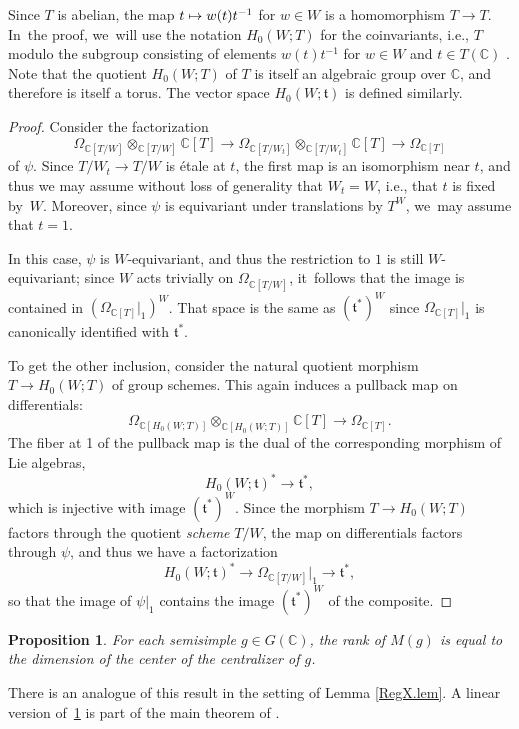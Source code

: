 \documentclass[JEP,XML,SOM,Unicode,NoFloatCountersInSection,published]{cedram}
\newcommand\mto{\mathchoice{\longmapsto}{\mapsto}{\mapsto}{\mapsto}}
\newtheorem{prop}[equation]{Proposition}
\theoremstyle{definition}
\newcommand{\mft}{\mathfrak{t}}
\newcommand{\C}{\mathbb{C}}
\begin{document}
Since $T$ is abelian, the map $t \mto w(t) t^{-1}$ for $w \in W$ is a homomorphism $T \to T$. In~the proof, we~will use the notation $H_0(W; T)$ for the coinvariants, i.e., $T$ modulo the subgroup consisting of elements $w(t) t^{-1}$ for $w \in W$ and $t \in T(\C)$ \cite[Ch.\,6]{Weibel:HA}. Note that the quotient $H_0(W; T)$ of $T$ is itself an algebraic group over $\C$, and therefore is itself a torus. The vector space $H_0(W; \mft)$ is defined similarly.

\begin{proof}
Consider the factorization
\[
\Omega_{\C[T/W]}\otimes_{\C[T/W]}\C[T]
\to
\Omega_{\C[T/W_t]}\otimes_{\C[T/W_t]}\C[T]
\to
\Omega_{\C[T]}
\]
of $\psi$.
Since $T/W_t\to T/W$ is étale at $t$, the first map is an isomorphism near $t$, and thus we may assume without loss of generality that $W_t=W$, i.e., that $t$ is fixed by~$W$. Moreover, since $\psi$ is equivariant under translations by $T^W$, we~may assume that $t=1$.

In this case, $\psi$ is $W$-equivariant, and thus the restriction to $1$
is still $W$-equivariant; since $W$ acts trivially on $\Omega_{\C[T/W]}$, it~follows that the image is contained in
$(\Omega_{\C[T]}|_1)^W$. That space is the same as $(\mft^*)^W$ since $\Omega_{\C[T]}\vert_1$ is canonically identified with $\mft^*$.

To get the other inclusion, consider the natural quotient morphism $T\to
H_0(W;T)$ of group schemes. This again induces a pullback map on
differentials:
\[
\Omega_{\C[H_0(W;T)]}\otimes_{\C[H_0(W;T)]} \C[T]
\to
\Omega_{\C[T]}.
\]
The fiber at 1 of the pullback map is the dual of the corresponding
morphism of Lie algebras,
\[
H_0(W;{\mft})^*\to {\mft}^*,
\]
which is injective with image $({\mft}^*)^W$. Since the morphism
$T\to H_0(W;T)$ factors through the quotient \emph{scheme} $T/W$, the map
on differentials factors through $\psi$, and thus we have a factorization
\[
H_0(W;{\mft})^*\to \Omega_{\C[T/W]}|_1\to {\mft}^*,
\]
so that the image of $\psi|_1$ contains the image $({\mft}^*)^W$
of the composite.
\end{proof}

\begin{prop} \label{corank}
For each semisimple
$g \in G(\C)$, the rank of $M(g)$ is equal
to the dimension of the center of the centralizer of $g$.
\end{prop}

There is an analogue of this result in the setting of Lemma \ref{RegX.lem}. A linear version of~\ref{corank} is part of the main theorem of \cite{St:inv}.
\end{document}
